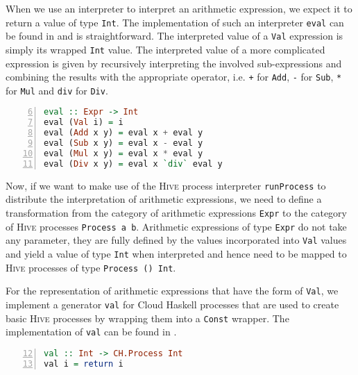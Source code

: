 When we use an interpreter to interpret an arithmetic expression, we expect it to return a value of type \texttt{Int}. The implementation of such an interpreter \texttt{eval} can be found in  and is straightforward. The interpreted value of a \texttt{Val} expression is simply its wrapped \texttt{Int} value. The interpreted value of a more complicated expression is given by recursively interpreting the involved sub-expressions and combining the results with the appropriate operator, i.e. \texttt{+} for \texttt{Add}, \texttt{-} for \texttt{Sub}, \texttt{*} for \texttt{Mul} and \texttt{div} for \texttt{Div}.
\begin{lstlisting}[language=Haskell, caption=Implementation of an interpreter for arithmetic expressions of type \texttt{Expr}., label=lst:arith_eval, numbers=left, frame=bt, firstnumber=6]
eval :: Expr -> Int
eval (Val i) = i
eval (Add x y) = eval x + eval y
eval (Sub x y) = eval x - eval y
eval (Mul x y) = eval x * eval y
eval (Div x y) = eval x `div` eval y
\end{lstlisting}

Now, if we want to make use of the \textsc{Hive} process interpreter \texttt{runProcess} to distribute the interpretation of arithmetic expressions, we need to define a transformation from the category of arithmetic expressions \texttt{Expr} to the category of \textsc{Hive} processes \texttt{Process a b}. Arithmetic expressions of type \texttt{Expr} do not take any parameter, they are fully defined by the values incorporated into \texttt{Val} values and yield a value of type \texttt{Int} when interpreted and hence need to be mapped to \textsc{Hive} processes of type \texttt{Process () Int}.

For the representation of arithmetic expressions that have the form of \texttt{Val}, we implement a generator \texttt{val} for \textsf{Cloud Haskell} processes that are used to create basic \textsc{Hive} processes by wrapping them into a \texttt{Const} wrapper. The implementation of \texttt{val} can be found in .
\begin{lstlisting}[language=Haskell, caption=A generator for \textsf{Cloud Haskell} process for the representation of \texttt{Val} nodes., label=lst:arith_val, numbers=left, frame=bt, firstnumber=12]
val :: Int -> CH.Process Int
val i = return i
\end{lstlisting}


